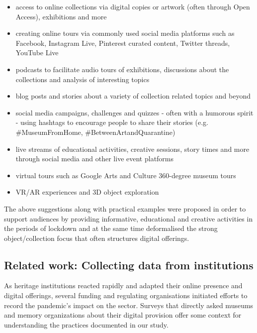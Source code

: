 \documentclass{egpubl}
\begin{document}
\begin{itemize}
\item access to online collections via digital copies or artwork (often through Open Access), exhibitions and more
  
\item creating online tours via commonly used social media platforms such as Facebook, Instagram Live, Pinterest curated content, Twitter threads, YouTube Live

\item podcasts to facilitate audio tours of exhibitions, discussions about the collections and analysis of interesting topics

\item blog posts and stories about a variety of collection related topics and beyond

\item social media campaigns, challenges and quizzes - often with a humorous spirit - using hashtags to encourage people to share their stories (e.g. \#MuseumFromHome, \#BetweenArtandQuarantine)

\item live streams of educational activities, creative sessions, story times and more through social media and other live event platforms

\item virtual tours such as Google Arts and Culture 360-degree museum tours

\item VR/AR experiences and 3D object exploration

\end{itemize}

The above suggestions along with practical examples were proposed in order to support audiences by providing informative, educational and creative activities in the periods of lockdown and at the same time deformalised the strong object/collection focus that often structures digital offerings.


\subsection{Related work: Collecting data from institutions}
\label{rel}
As heritage institutions reacted rapidly and adapted their online presence and digital offerings, several funding and regulating organisations initiated efforts to record the pandemic's impact on the sector. Surveys that directly asked museums and memory organizations about their digital provision offer some context for understanding the practices documented in our study.
\end{document}
